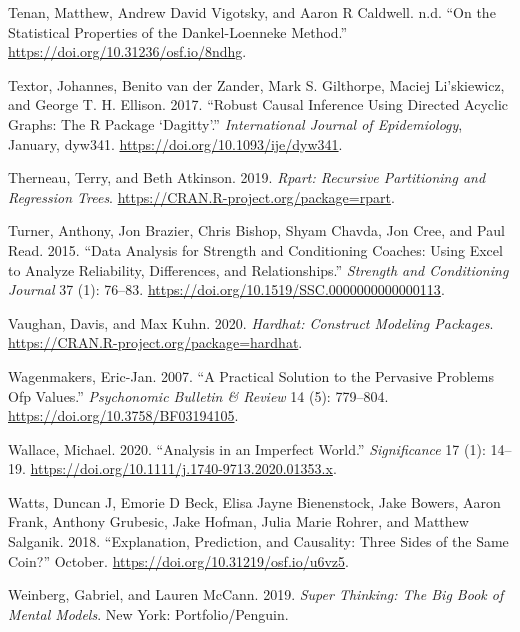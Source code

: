\documentclass[
]{book}
\newlength{\cslhangindent}
\newenvironment{cslreferences}%
  {\setlength{\parindent}{0pt}%
  \everypar{\setlength{\hangindent}{\cslhangindent}}\ignorespaces}%
  {\par}
\begin{document}
\begin{cslreferences}
\leavevmode\hypertarget{ref-tenanStatisticalPropertiesDankelLoenneke}{}%
Tenan, Matthew, Andrew David Vigotsky, and Aaron R Caldwell. n.d. ``On the Statistical Properties of the Dankel-Loenneke Method.'' \url{https://doi.org/10.31236/osf.io/8ndhg}.

\leavevmode\hypertarget{ref-textorRobustCausalInference2017}{}%
Textor, Johannes, Benito van der Zander, Mark S. Gilthorpe, Maciej Li\a'skiewicz, and George T. H. Ellison. 2017. ``Robust Causal Inference Using Directed Acyclic Graphs: The R Package `Dagitty'.'' \emph{International Journal of Epidemiology}, January, dyw341. \url{https://doi.org/10.1093/ije/dyw341}.

\leavevmode\hypertarget{ref-R-rpart}{}%
Therneau, Terry, and Beth Atkinson. 2019. \emph{Rpart: Recursive Partitioning and Regression Trees}. \url{https://CRAN.R-project.org/package=rpart}.

\leavevmode\hypertarget{ref-turnerDataAnalysisStrength2015}{}%
Turner, Anthony, Jon Brazier, Chris Bishop, Shyam Chavda, Jon Cree, and Paul Read. 2015. ``Data Analysis for Strength and Conditioning Coaches: Using Excel to Analyze Reliability, Differences, and Relationships.'' \emph{Strength and Conditioning Journal} 37 (1): 76--83. \url{https://doi.org/10.1519/SSC.0000000000000113}.

\leavevmode\hypertarget{ref-R-hardhat}{}%
Vaughan, Davis, and Max Kuhn. 2020. \emph{Hardhat: Construct Modeling Packages}. \url{https://CRAN.R-project.org/package=hardhat}.

\leavevmode\hypertarget{ref-wagenmakersPracticalSolutionPervasive2007}{}%
Wagenmakers, Eric-Jan. 2007. ``A Practical Solution to the Pervasive Problems Ofp Values.'' \emph{Psychonomic Bulletin \& Review} 14 (5): 779--804. \url{https://doi.org/10.3758/BF03194105}.

\leavevmode\hypertarget{ref-wallaceAnalysisImperfectWorld2020}{}%
Wallace, Michael. 2020. ``Analysis in an Imperfect World.'' \emph{Significance} 17 (1): 14--19. \url{https://doi.org/10.1111/j.1740-9713.2020.01353.x}.

\leavevmode\hypertarget{ref-wattsExplanationPredictionCausality2018}{}%
Watts, Duncan J, Emorie D Beck, Elisa Jayne Bienenstock, Jake Bowers, Aaron Frank, Anthony Grubesic, Jake Hofman, Julia Marie Rohrer, and Matthew Salganik. 2018. ``Explanation, Prediction, and Causality: Three Sides of the Same Coin?'' October. \url{https://doi.org/10.31219/osf.io/u6vz5}.

\leavevmode\hypertarget{ref-weinbergSuperThinkingBig2019}{}%
Weinberg, Gabriel, and Lauren McCann. 2019. \emph{Super Thinking: The Big Book of Mental Models}. New York: Portfolio/Penguin.


\end{cslreferences}
\end{document}

